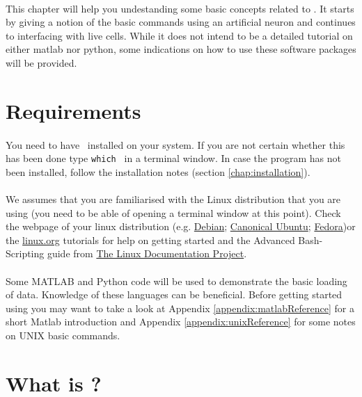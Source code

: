 \paragraph{}
This chapter will help you undestanding some basic concepts related to \progname. It starts by giving a notion of the basic commands using an artificial neuron and continues to interfacing with live cells. While it does not intend to be a detailed tutorial on either matlab nor python, some indications on how to use these software packages will be provided.

\section{Requirements}
\paragraph{}
You need to have \progname\ installed on your system. If you are not certain whether this has been done type \texttt{which \progname} in a terminal window. In case the program has not been installed, follow the installation notes (section \ref{chap:installation}).

\paragraph{}
We assumes that you are familiarised with the Linux distribution that you are using (you need to be able of opening a terminal window at this point). Check the webpage of your linux distribution (e.g. \href{http://www.debian.org}{Debian}; \href{http://www.ubuntu.com}{Canonical Ubuntu}; \href{http://www.fedoraproject.org}{Fedora})or the \href{http://www.linux.org/tutorial}{linux.org} tutorials for help on getting started and the Advanced Bash-Scripting guide from \href{http://www.tldp.org}{The Linux Documentation Project}.

\paragraph{}
Some MATLAB and Python code will be used to demonstrate the basic loading of data. Knowledge of these languages can be beneficial.
Before getting started using \texttt{\progname} you may want to take a look at Appendix \ref{appendix:matlabReference} for a short Matlab introduction and Appendix \ref{appendix:unixReference} for some notes on UNIX basic commands.

\section{What is \progname?}

